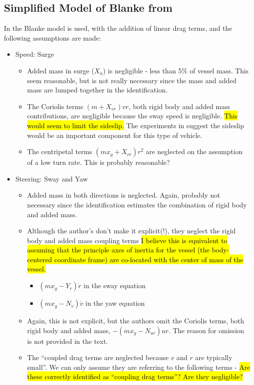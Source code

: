 \documentclass[11pt,draftcls,journal,onecolumn]{../latexlib/latex_ieee/IEEEtran}
\begin{document}
\subsection{Simplified Model of Blanke from \cite{caccia08practical}}
In \cite{caccia08practical} the Blanke model is used, with the addition of linear drag terms, and the following assumptions are made:
\begin{itemize}
\item Speed: Surge
  \begin{itemize}
  \item Added mass in surge ($X_{\dot{u}}$) is negligible - less than 5\% of vessel mass.  This seem reasonable, but is not really necessary since the mass and added mass are lumped together in the identification.
  \item The Coriolis terms $(m+X_{vr})vr$, both rigid body and added mass contributions, are negligible because the sway speed is negligible.  \hl{This would seem to limit the sideslip.}  The experiments in \cite{sonnenburg10control}suggest the sideslip would be an important component for this type of vehicle.
  \item The centripetal terms $(mx_g+X_{rr})r^2$ are neglected on the assumption of a low turn rate.  This is probably reasonable?
  \end{itemize}
\item Steering: Sway and Yaw
  \begin{itemize}
  \item Added mass in both directions is neglected.  Again, probably not necessary since the identification estimates the combination of rigid body and added mass.
  \item Although the author's don't make it explicit(!), they neglect the rigid body and added mass coupling terms  \hl{I believe this is equivalent to assuming that the principle axes of inertia for the vessel (the body-centered coordinate frame) are co-located with the center of mass of the vessel.}
    \begin{itemize}
    \item $(m x_g - Y_{\dot{r}})\dot{r}$ in the sway equation
    \item $(m x_g - N_{\dot{v}})\dot{v}$ in the yaw equation
    \end{itemize}
  \item Again, this is not explicit, but the authors omit the Coriolis terms, both rigid body and added mass, $-(mx_g-N_{ur})ur$. The reason for omission is not provided in the text.
  \item The ``coupled drag terms are neglected because $v$ and $r$ are typically small''.  We can only assume they are referring to the following terms - \hl{Are these correctly identified as ``coupling drag terms''?  Are they negligible?}

\end{itemize}
\end{itemize}
\end{document}

